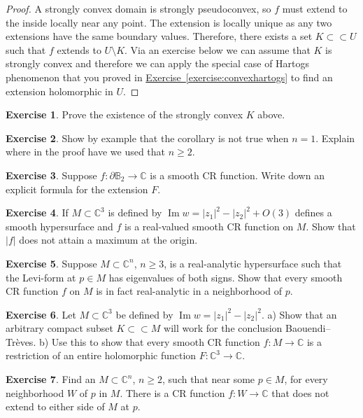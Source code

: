 \documentclass[12pt,openany]{book}
\renewcommand{\Im}{\operatorname{Im}}
\newcommand{\sabs}[1]{\lvert {#1} \rvert}
\newcommand{\C}{{\mathbb{C}}}
\newcommand{\bB}{{\mathbb{B}}}
\theoremstyle{plain}
\theoremstyle{remark}
\theoremstyle{definition}
\newenvironment{exbox}{%
    \def\FrameCommand{\vrule width 1pt \relax\hspace {10pt}}%
    \MakeFramed {\advance \hsize -\width \FrameRestore }%
}{%
    \endMakeFramed
}
\theoremstyle{exercise}
\newtheorem{exercise}{Exercise}[section]
\theoremstyle{example}
\newcommand{\exerciseref}[1]{\hyperref[#1]{Exercise~\ref*{#1}}}
\begin{document}
\begin{proof}
A strongly convex domain is strongly pseudoconvex, so $f$ must extend to the
inside locally near any point.  The extension is locally unique as any two
extensions have the same boundary values.  Therefore, there exists a set
$K \subset \subset U$ such that $f$ extends to $U \setminus K$.
Via an exercise below we can assume that $K$ is strongly convex and
therefore we can apply the special case of Hartogs phenomenon
that you proved in \exerciseref{exercise:convexhartogs} to find an
extension holomorphic in $U$.
\end{proof}

\begin{exbox}
\begin{exercise}
Prove the existence of the strongly convex $K$ above.
\end{exercise}

\begin{exercise}
Show by example that the corollary is not true when $n=1$.  Explain where in
the proof have we used that $n \geq 2$.
\end{exercise}

\begin{exercise}
Suppose $f \colon \partial \bB_2 \to \C$ is a smooth CR function.
Write down an explicit formula for the extension $F$.
\end{exercise}

\begin{exercise}
If $M \subset \C^3$ is defined by $\Im w = \sabs{z_1}^2-\sabs{z_2}^2 + O(3)$
defines a smooth hypersurface and $f$ is a real-valued smooth CR function on $M$.  Show
that $\sabs{f}$ does not attain a maximum at the origin.
\end{exercise}

\begin{exercise}
Suppose $M \subset \C^n$, $n \geq 3$, is a real-analytic hypersurface
such that the Levi-form at $p \in M$ has eigenvalues of both signs.
Show that every smooth CR function $f$ on $M$ is in fact real-analytic in
a neighborhood of $p$.
\end{exercise}

\begin{exercise}
Let $M \subset \C^3$ be defined by $\Im w = \sabs{z_1}^2-\sabs{z_2}^2$.
a) Show that an arbitrary compact subset $K \subset \subset M$ will work
for the conclusion Baouendi--Tr{\`e}ves.  b) Use this to show that every
smooth CR function $f \colon M \to \C$ is a restriction of an entire holomorphic function
$F \colon \C^3 \to \C$.
\end{exercise}

\begin{exercise}
Find an $M \subset \C^n$, $n \geq 2$, such that near some $p \in M$,
for every neighborhood $W$ of $p$ in $M$.  There is a CR function $f \colon
W \to \C$ that does not extend to either side of $M$ at $p$.
\end{exercise}
\end{exbox}
\end{document}
